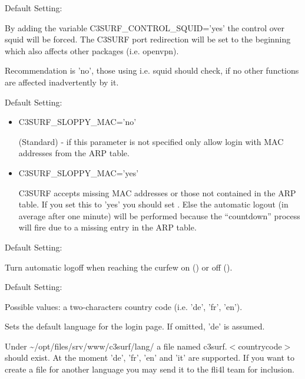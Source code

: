 \begin{itemize}
\begin{description}
  Default Setting: 

  By adding the variable C3SURF\_CONTROL\_SQUID='yes' the control over squid
  will be forced. The C3SURF port redirection will be set to the beginning
  which also affects other packages (i.e. openvpn).

  Recommendation is 'no', those using i.e. squid should check, if no
  other functions are affected inadvertently by it.


  Default Setting: 

   \begin{itemize}
      \item{C3SURF\_SLOPPY\_MAC='no'}

            (Standard) - if this parameter is not specified only allow
            login with MAC addresses from the ARP table.

       \item{C3SURF\_SLOPPY\_MAC='yes'}

            C3SURF accepts missing MAC addresses or those not contained in the ARP table.
            If you set this to 'yes' you should set .
            Else the automatic logout (in average after one minute) will be performed because the
            ``countdown'' process will fire due to a missing entry in the ARP table.
   \end{itemize}


  Default Setting: 

  Turn automatic logoff when reaching the curfew on () or off ().


  Default Setting: 

  Possible values: a two-characters country code (i.e. 'de', 'fr', 'en').

  Sets the default language for the login page. If omitted, 'de' is assumed.

  Under \textasciitilde/opt/files/srv/www/c3surf/lang/ a file named
  c3surf.$<$countrycode$>$ should exist. At the moment 'de', 'fr', 'en' and
  'it' are supported. If you want to create a file for another language you may
  send it to the fli4l team for inclusion.


\end{description}
\end{itemize}

